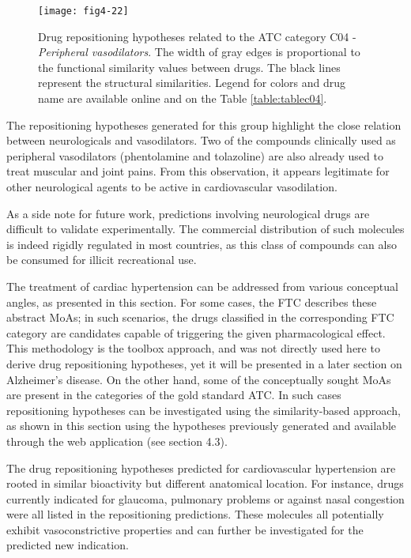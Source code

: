 \begin{figure}[H]
    \centering
    \texttt{[image: fig4-22]}
    \caption{Drug repositioning hypotheses related to the ATC category C04 - \emph{Peripheral vasodilators}. The width of gray edges is proportional to the functional similarity values between drugs. The black lines represent the structural similarities. Legend for colors and drug name are available online and on the Table \ref{table:tablec04}.}
    \label{fig4-22}
\end{figure}

The repositioning hypotheses generated for this group highlight the close relation between neurologicals and vasodilators. Two of the compounds clinically used as peripheral vasodilators (phentolamine and tolazoline) are also already used to treat muscular and joint pains. From this observation, it appears legitimate for other neurological agents to be active in cardiovascular vasodilation.

As a side note for future work, predictions involving neurological drugs are difficult to validate experimentally. The commercial distribution of such molecules is indeed rigidly regulated in most countries, as this class of compounds can also be consumed for illicit recreational use.

The treatment of cardiac hypertension can be addressed from various conceptual angles, as presented in this section. For some cases, the FTC describes these abstract MoAs; in such scenarios, the drugs classified in the corresponding FTC category are candidates capable of triggering the given pharmacological effect. This methodology is the toolbox approach, and was not directly used here to derive drug repositioning hypotheses, yet it will be presented in a later section on Alzheimer's disease. On the other hand, some of the conceptually sought MoAs are present in the categories of the gold standard ATC. In such cases repositioning hypotheses can be investigated using the similarity-based approach, as shown in this section using the hypotheses previously generated and available through the web application (see section 4.3).

The drug repositioning hypotheses predicted for cardiovascular hypertension are rooted in similar bioactivity but different anatomical location. For instance, drugs currently indicated for glaucoma, pulmonary problems or against nasal congestion were all listed in the repositioning predictions. These molecules all potentially exhibit vasoconstrictive properties and can further be investigated for the predicted new indication.

